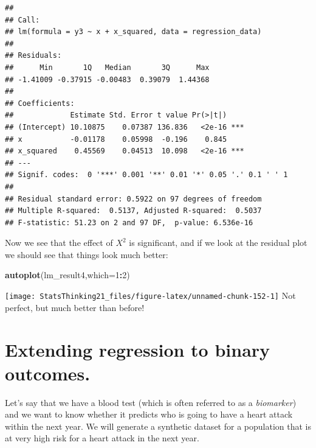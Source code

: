\documentclass[
  12pt,
]{book}
\newenvironment{Shaded}{\begin{snugshade}}{\end{snugshade}}
\newcommand{\AttributeTok}[1]{\textcolor[rgb]{0.13,0.29,0.53}{#1}}
\newcommand{\DecValTok}[1]{\textcolor[rgb]{0.00,0.00,0.81}{#1}}
\newcommand{\FunctionTok}[1]{\textcolor[rgb]{0.13,0.29,0.53}{\textbf{#1}}}
\newcommand{\NormalTok}[1]{#1}
\newcommand{\SpecialCharTok}[1]{\textcolor[rgb]{0.81,0.36,0.00}{\textbf{#1}}}
\begin{document}
\begin{verbatim}
## 
## Call:
## lm(formula = y3 ~ x + x_squared, data = regression_data)
## 
## Residuals:
##      Min       1Q   Median       3Q      Max 
## -1.41009 -0.37915 -0.00483  0.39079  1.44368 
## 
## Coefficients:
##             Estimate Std. Error t value Pr(>|t|)    
## (Intercept) 10.10875    0.07387 136.836   <2e-16 ***
## x           -0.01178    0.05998  -0.196    0.845    
## x_squared    0.45569    0.04513  10.098   <2e-16 ***
## ---
## Signif. codes:  0 '***' 0.001 '**' 0.01 '*' 0.05 '.' 0.1 ' ' 1
## 
## Residual standard error: 0.5922 on 97 degrees of freedom
## Multiple R-squared:  0.5137, Adjusted R-squared:  0.5037 
## F-statistic: 51.23 on 2 and 97 DF,  p-value: 6.536e-16
\end{verbatim}

Now we see that the effect of \(X^2\) is significant, and if we look at the residual plot we should see that things look much better:

\begin{Shaded}
\begin{Highlighting}[]
\FunctionTok{autoplot}\NormalTok{(lm\_result4,}\AttributeTok{which=}\DecValTok{1}\SpecialCharTok{:}\DecValTok{2}\NormalTok{)}
\end{Highlighting}
\end{Shaded}

\texttt{[image: StatsThinking21\_files/figure-latex/unnamed-chunk-152-1]}
Not perfect, but much better than before!

\hypertarget{extending-regression-to-binary-outcomes.}{%
\section{Extending regression to binary outcomes.}\label{extending-regression-to-binary-outcomes.}}

Let's say that we have a blood test (which is often referred to as a \emph{biomarker}) and we want to know whether it predicts who is going to have a heart attack within the next year. We will generate a synthetic dataset for a population that is at very high risk for a heart attack in the next year.
\end{document}
